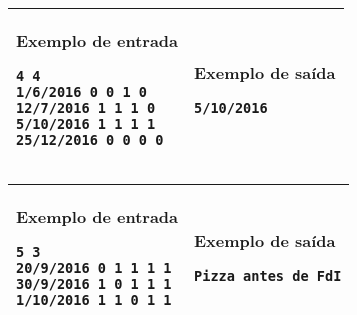 \begin{table}[!h]
\centering
\begin{tabular}{|l|l|}
\hline
\begin{minipage}[t]{3in}
\textbf{Exemplo de entrada}
\begin{verbatim}
4 4
1/6/2016 0 0 1 0
12/7/2016 1 1 1 0
5/10/2016 1 1 1 1
25/12/2016 0 0 0 0
\end{verbatim}
\vspace{1mm}
\end{minipage}
&

\begin{minipage}[t]{3in}
\textbf{Exemplo de saída}
\begin{verbatim}
5/10/2016
\end{verbatim}
\vspace{1mm}
\end{minipage} \\
\hline
\end{tabular}
\end{table}

\begin{table}[!h]
\centering
\begin{tabular}{|l|l|}
\hline
\begin{minipage}[t]{3in}
\textbf{Exemplo de entrada}
\begin{verbatim}
5 3
20/9/2016 0 1 1 1 1
30/9/2016 1 0 1 1 1
1/10/2016 1 1 0 1 1
\end{verbatim}
\vspace{1mm}
\end{minipage}
&

\begin{minipage}[t]{3in}
\textbf{Exemplo de saída}
\begin{verbatim}
Pizza antes de FdI
\end{verbatim}
\vspace{1mm}
\end{minipage} \\
\hline
\end{tabular}
\end{table}
